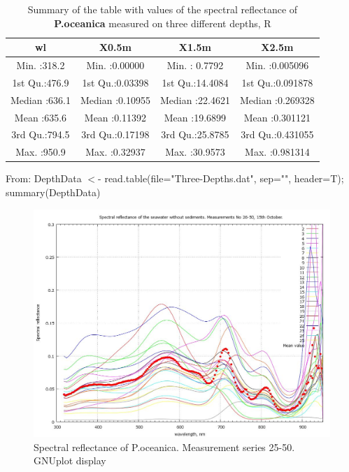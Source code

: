 \documentclass[10pt, a4paper]{article}
\begin{document}
\begin{appendices}
\pagebreak

\begin{table}[htbp]
\caption{Summary of the table with values of the spectral reflectance of \textbf{P.oceanica} measured on three different depths, R}
\label{tab:13}
\begin{center}
\begin{tabular}{|c|c|c|c|}
\hline\hline
wl & X0.5m & X1.5m & X2.5m\\ \hline\hline
Min.   :318.2   &  Min.   :0.00000     &   Min.   : 0.7792     &   Min.   :0.005096  \\ \hline
 1st Qu.:476.9   &  1st Qu.:0.03398    &  1st Qu.:14.4084    &  1st Qu.:0.091878  \\ \hline
 Median :636.1   &   Median :0.10955    &  Median :22.4621   &  Median :0.269328 \\ \hline 
 Mean   :635.6   &   Mean   :0.11392   &   Mean   :19.6899   &  Mean   :0.301121  \\ \hline
 3rd Qu.:794.5   &   3rd Qu.:0.17198   &   3rd Qu.:25.8785    &  3rd Qu.:0.431055 \\ \hline  
 Max.   :950.9     &  Max.   :0.32937    &  Max.   :30.9573   &   Max.   :0.981314  \\ \hline
\end{tabular}
\end{center}
From: DepthData $<$- read.table(file="Three-Depths.dat", sep="", header=T); summary(DepthData)
\end{table}

\begin{figure}[H]
\begin{center}
\includegraphics[scale=0.25]{GNU-11.jpg}
\caption{Spectral reflectance of P.oceanica. Measurement series 25-50. GNUplot display­}
\label{fig:54}
\end{center}
\end{figure}
\pagebreak


\end{appendices}
\end{document}
